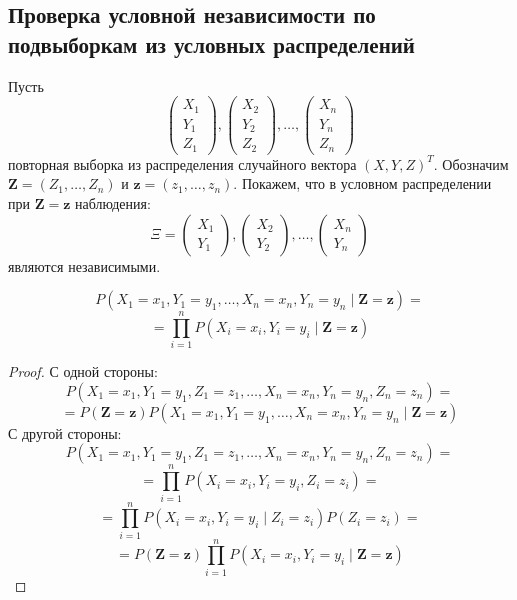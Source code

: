 \subsection{Проверка условной независимости по подвыборкам из условных распределений}
Пусть
$$
\begin{pmatrix}
        X_1 \\
        Y_1 \\
        Z_1
    \end{pmatrix},
    \begin{pmatrix}
        X_2 \\
        Y_2 \\
        Z_2
    \end{pmatrix}, \ldots,
    \begin{pmatrix}
        X_n \\
        Y_n \\
        Z_n
    \end{pmatrix}
$$ повторная выборка из распределения случайного вектора $(X,Y,Z)^T$. Обозначим $\mathbf{Z}=(Z_1,\ldots,Z_n)$ и 
$\mathbf{z}=(z_1,\ldots,z_n)$.
Покажем, что в условном распределении при $\mathbf{Z}=\mathbf{z}$ наблюдения:
$$
\Xi = 
\begin{pmatrix}
        X_1 \\
        Y_1
    \end{pmatrix},
    \begin{pmatrix}
        X_2 \\
        Y_2
    \end{pmatrix}, \ldots,
    \begin{pmatrix}
        X_n \\
        Y_n
    \end{pmatrix}
$$
являются независимыми. 

\begin{lemma}\label{ci_for_samples}
    $$
    P(X_1=x_1,Y_1=y_1,\ldots,X_n=x_n,Y_n=y_n \mid \mathbf{Z}=\mathbf{z})=
    $$
    $$
    =\prod_{i=1}^n P(X_i=x_i, Y_i=y_i \mid \mathbf{Z}=\mathbf{z})
    $$
\end{lemma}
\begin{proof}
    С одной стороны:
    $$
    P(X_1=x_1,Y_1=y_1,Z_1=z_1,\ldots,X_n=x_n,Y_n=y_n,Z_n=z_n)=
    $$
    $$
    =P(\mathbf{Z}=\mathbf{z}) P(X_1=x_1,Y_1=y_1,\ldots,X_n=x_n,Y_n=y_n \mid \mathbf{Z}=\mathbf{z}) 
    $$
    С другой стороны:
    $$
    P(X_1=x_1,Y_1=y_1,Z_1=z_1,\ldots,X_n=x_n,Y_n=y_n,Z_n=z_n)=
    $$
    $$
    =\prod_{i=1}^n P(X_i=x_i, Y_i=y_i, Z_i=z_i)=
    $$
    $$
    =\prod_{i=1}^n P(X_i=x_i, Y_i=y_i \mid Z_i=z_i)P(Z_i=z_i)=
    $$
    $$
    =P(\mathbf{Z}=\mathbf{z})\prod_{i=1}^n P(X_i=x_i, Y_i=y_i \mid \mathbf{Z}=\mathbf{z})
    $$
\end{proof}

